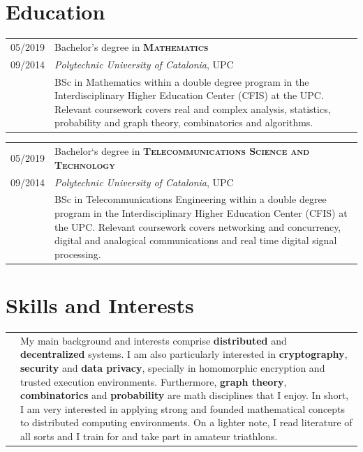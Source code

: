 \documentclass[a4paper,10pt]{article} %
\begin{document}
\section{Education}

\begin{tabular}{R{1.5cm}|p{13.8cm}}	
    \textsc{05/2019} & Bachelor's degree in \textbf{\textsc{Mathematics}} \\ 
    \textsc{09/2014} & \small{\emph{Polytechnic University of Catalonia}, UPC}\\
     & \footnotesize{BSc in Mathematics within a double degree program in the Interdisciplinary Higher Education Center (CFIS) at the UPC. Relevant coursework covers real and complex analysis, statistics, probability and graph theory, combinatorics and algorithms.}
\end{tabular}

\begin{tabular}{R{1.5cm}|p{13.8cm}}	
    \textsc{05/2019} &  Bachelor`s degree in \textbf{\textsc{Telecommunications Science and Technology}}\\ 
    \textsc{09/2014} & \small{\emph{Polytechnic University of Catalonia}, UPC} \\
     & \footnotesize{BSc in Telecommunications Engineering within a double degree program in the Interdisciplinary Higher Education Center (CFIS) at the UPC. Relevant coursework covers networking and concurrency, digital and analogical communications and real time digital signal processing.}
\end{tabular}


\section{Skills and Interests}

\begin{tabular}{R{1.5cm}|p{13.8cm}}
    & {My main background and interests comprise \textbf{distributed} and \textbf{decentralized} systems. I am also particularly interested in \textbf{cryptography}, \textbf{security} and \textbf{data privacy}, specially in homomorphic encryption and trusted execution environments. Furthermore, \textbf{graph theory}, \textbf{combinatorics} and \textbf{probability} are math disciplines that I enjoy. In short, I am very interested in applying strong and founded mathematical concepts to distributed computing environments. On a lighter note, I read literature of all sorts and I train for and take part in amateur triathlons.}  \\
\end{tabular}
\end{document}
